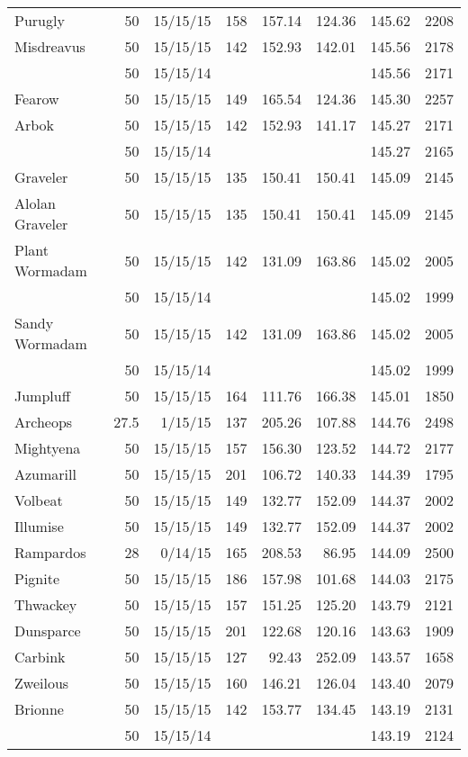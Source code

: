 \begin{longtable}{lrrrrrrr}
Purugly & 50 & 15/15/15 & 158 & 157.14 & 124.36 & 145.62 & 2208\\
Misdreavus & 50 & 15/15/15 & 142 & 152.93 & 142.01 & 145.56 & 2178\\
 & 50 & 15/15/14 & & & & 145.56 & 2171\\
Fearow & 50 & 15/15/15 & 149 & 165.54 & 124.36 & 145.30 & 2257\\
Arbok & 50 & 15/15/15 & 142 & 152.93 & 141.17 & 145.27 & 2171\\
 & 50 & 15/15/14 & & & & 145.27 & 2165\\
Graveler & 50 & 15/15/15 & 135 & 150.41 & 150.41 & 145.09 & 2145\\
Alolan Graveler & 50 & 15/15/15 & 135 & 150.41 & 150.41 & 145.09 & 2145\\
Plant Wormadam & 50 & 15/15/15 & 142 & 131.09 & 163.86 & 145.02 & 2005\\
 & 50 & 15/15/14 & & & & 145.02 & 1999\\
Sandy Wormadam & 50 & 15/15/15 & 142 & 131.09 & 163.86 & 145.02 & 2005\\
 & 50 & 15/15/14 & & & & 145.02 & 1999\\
Jumpluff & 50 & 15/15/15 & 164 & 111.76 & 166.38 & 145.01 & 1850\\
Archeops & 27.5 & 1/15/15 & 137 & 205.26 & 107.88 & 144.76 & 2498\\
Mightyena & 50 & 15/15/15 & 157 & 156.30 & 123.52 & 144.72 & 2177\\
Azumarill & 50 & 15/15/15 & 201 & 106.72 & 140.33 & 144.39 & 1795\\
Volbeat & 50 & 15/15/15 & 149 & 132.77 & 152.09 & 144.37 & 2002\\
Illumise & 50 & 15/15/15 & 149 & 132.77 & 152.09 & 144.37 & 2002\\
Rampardos & 28 & 0/14/15 & 165 & 208.53 & 86.95 & 144.09 & 2500\\
Pignite & 50 & 15/15/15 & 186 & 157.98 & 101.68 & 144.03 & 2175\\
Thwackey & 50 & 15/15/15 & 157 & 151.25 & 125.20 & 143.79 & 2121\\
Dunsparce & 50 & 15/15/15 & 201 & 122.68 & 120.16 & 143.63 & 1909\\
Carbink & 50 & 15/15/15 & 127 & 92.43 & 252.09 & 143.57 & 1658\\
Zweilous & 50 & 15/15/15 & 160 & 146.21 & 126.04 & 143.40 & 2079\\
Brionne & 50 & 15/15/15 & 142 & 153.77 & 134.45 & 143.19 & 2131\\
 & 50 & 15/15/14 & & & & 143.19 & 2124\\

\end{longtable}
